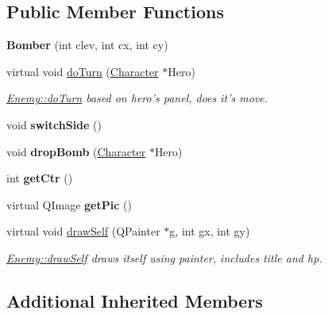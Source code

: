 \subsection*{Public Member Functions}
\begin{DoxyCompactItemize}
\item 
\hypertarget{class_bomber_a69a81ac540c1330e0e6469d236ec5914}{{\bfseries Bomber} (int clev, int cx, int cy)}\label{class_bomber_a69a81ac540c1330e0e6469d236ec5914}

\item 
virtual void \hyperlink{class_bomber_ac0f488834e2abdab290699d6efa6e72e}{do\-Turn} (\hyperlink{class_character}{Character} $\ast$Hero)
\begin{DoxyCompactList}\small\item\em \hyperlink{class_enemy_a56e4b9b07e8cd2a4e5ecfa8ff5b9265a}{Enemy\-::do\-Turn} based on hero's panel, does it's move. \end{DoxyCompactList}\item 
\hypertarget{class_bomber_a1ea183ca52092dc27c08f6595072b3a5}{void {\bfseries switch\-Side} ()}\label{class_bomber_a1ea183ca52092dc27c08f6595072b3a5}

\item 
\hypertarget{class_bomber_a500004b8c74a11109bc8174340f3c72d}{void {\bfseries drop\-Bomb} (\hyperlink{class_character}{Character} $\ast$Hero)}\label{class_bomber_a500004b8c74a11109bc8174340f3c72d}

\item 
\hypertarget{class_bomber_af3d20f9c5832eafe7530a22d04294951}{int {\bfseries get\-Ctr} ()}\label{class_bomber_af3d20f9c5832eafe7530a22d04294951}

\item 
\hypertarget{class_bomber_a3b181f6557c19d65adfddb9226a4edfb}{virtual Q\-Image {\bfseries get\-Pic} ()}\label{class_bomber_a3b181f6557c19d65adfddb9226a4edfb}

\item 
virtual void \hyperlink{class_bomber_aa75d9256efa7f2996a599deb3db83f90}{draw\-Self} (Q\-Painter $\ast$g, int gx, int gy)
\begin{DoxyCompactList}\small\item\em \hyperlink{class_enemy_a3251244e8e7ac657687d6be5a8da71bb}{Enemy\-::draw\-Self} draws itself using painter, includes title and hp. \end{DoxyCompactList}\end{DoxyCompactItemize}
\subsection*{Additional Inherited Members}


